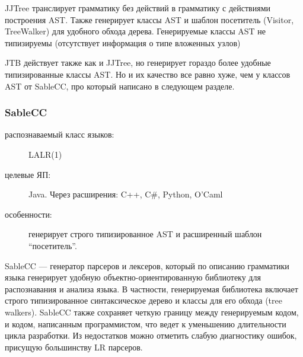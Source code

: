 \documentclass[a4paper,12pt,titlepage]{extarticle}
\begin{document}
JJTree транслирует грамматику без действий в грамматику с действиями
построения AST. Также генерирует классы AST и шаблон посетитель
(Visitor, TreeWalker) для удобного обхода дерева. Генерируемые классы AST не
типизируемы (отсутствует информация о типе вложенных узлов)

JTB действует также как и JJTree, но генерирует гораздо более удобные
типизированные классы AST. Но и их качество все равно хуже, чем у классов AST от
SableCC, про который написано в следующем разделе.

\subsubsection*{SableCC}
\label{sablecc}
\begin{description}
  \item[распознаваемый класс языков:] LALR(1)
  \item[целевые ЯП:] Java. Через расширения: C++, C\#, Python, O'Caml
  \item[особенности:] генерирует строго типизированное AST и расширенный
 	шаблон ``посетитель''.
\end{description}

SableCC --- генератор парсеров и лексеров, который по описанию грамматики языка
генерирует удобную объектно-ориентированную библиотеку для распознавания
и анализа языка. В частности, генерируемая
библиотека включает строго типизированное синтаксическое дерево и классы для
его обхода (tree walkers). SableCC  также сохраняет четкую границу между
генерируемым кодом, и кодом, написанным программистом, что ведет к уменьшению
длительности цикла разработки. Из недостатков можно отметить слабую диагностику
ошибок, присущую большинству LR парсеров.
\end{document}
